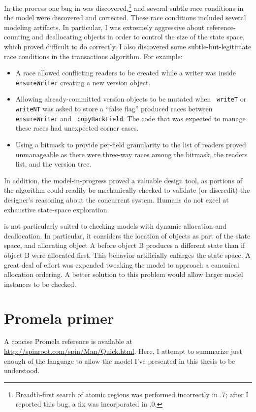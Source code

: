 In the process one bug in \Spin was discovered,\footnote{Breadth-first
search of atomic regions was performed incorrectly in .7;
after I reported this bug, a fix was incorporated in .0.}
and several subtle race conditions in the model were discovered and
corrected.  These race conditions included several modeling artifacts.
In particular, I was extremely aggressive about reference-counting and
deallocating objects in order to control the size of the state space,
which proved difficult to do correctly.  I also discovered some
subtle-but-legitimate race conditions in the transactions algorithm.
For example:
\begin{itemize}
\item A race allowed conflicting readers to be created while a writer
  was inside {\tt ensureWriter} creating a new version object.
\item Allowing already-committed version objects to be mutated when {\tt
    writeT} or {\tt writeNT} was asked to store a ``false flag'' produced
  races between {\tt ensureWriter} and {\tt
    copyBackField}.  The code that was expected to manage these races
  had unexpected corner cases.
\item Using a bitmask to provide per-field granularity
  to the list of readers proved unmanageable as there were three-way
  races among the bitmask, the readers list, and the version tree.
\end{itemize}
In addition, the model-in-progress proved a valuable design tool, as
portions of the algorithm could readily be mechanically checked to
validate (or discredit) the designer's reasoning about the concurrent
system.  Humans do not excel at exhaustive state-space exploration.

\Spin is not particularly suited to checking models with dynamic
allocation and deallocation.  In particular, it considers the
location of objects as part of the state space, and allocating object
A before object B produces a different state than if object B
were allocated first.  This behavior artificially enlarges the
state space.  A great deal of effort was expended tweaking the
model to approach a canonical allocation ordering.  A better solution
to this problem would allow larger model instances to be checked.


\section{Promela primer}\label{sec:promela}
A concise Promela reference is available at
\url{http://spinroot.com/spin/Man/Quick.html}. Here, I attempt to
summarize just enough of the language to allow the model I've
presented in this thesis to be understood.

